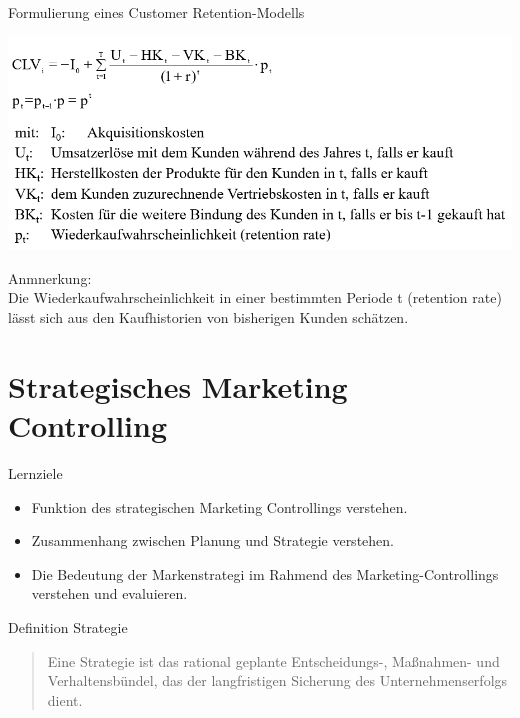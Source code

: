 \documentclass[12pt,ngerman,a4paper,ignorenonframetext,]{beamer}
\providecommand{\tightlist}{%
  \setlength{\itemsep}{0pt}\setlength{\parskip}{0pt}}
\begin{document}
\begin{frame}{Formulierung eines Customer Retention-Modells}
\protect\hypertarget{formulierung-eines-customer-retention-modells}{}

\begin{center}\includegraphics[width=0.8\linewidth]{./images/Marketingcontrolling/CLV6} \end{center}

Anmnerkung:\\
Die Wiederkaufwahrscheinlichkeit in einer bestimmten Periode t
(retention rate) lässt sich aus den Kaufhistorien von bisherigen Kunden
schätzen.

\end{frame}

\hypertarget{strategisches-marketing-controlling}{%
\section{Strategisches Marketing
Controlling}\label{strategisches-marketing-controlling}}

\begin{frame}{Lernziele}
\protect\hypertarget{lernziele-3}{}

\begin{itemize}
\tightlist
\item
  Funktion des strategischen Marketing Controllings verstehen.
\item
  Zusammenhang zwischen Planung und Strategie verstehen.
\item
  Die Bedeutung der Markenstrategi im Rahmend des Marketing-Controllings
  verstehen und evaluieren.
\end{itemize}

\end{frame}

\begin{frame}{Definition Strategie}
\protect\hypertarget{definition-strategie}{}

\begin{quote}
Eine Strategie ist das rational geplante Entscheidungs-, Maßnahmen- und
Verhaltensbündel, das der langfristigen Sicherung des
Unternehmenserfolgs dient.
\end{quote}

\end{frame}
\end{document}
